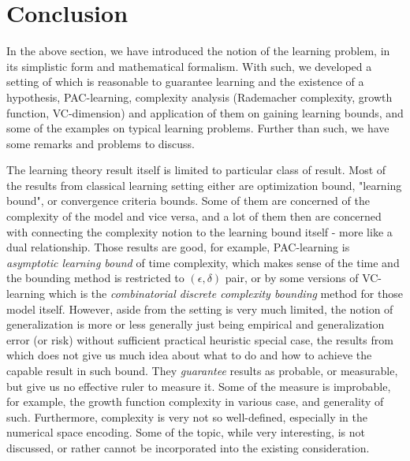 \section{Conclusion}

In the above section, we have introduced the notion of the learning problem, in its simplistic form and mathematical formalism. With such, we developed a setting of which is reasonable to guarantee learning and the existence of a hypothesis, PAC-learning, complexity analysis (Rademacher complexity, growth function, VC-dimension) and application of them on gaining learning bounds, and some of the examples on typical learning problems. Further than such, we have some remarks and problems to discuss. 

The learning theory result itself is limited to particular class of result. Most of the results from classical learning setting either are optimization bound, "learning bound", or convergence criteria bounds. Some of them are concerned of the complexity of the model and vice versa, and a lot of them then are concerned with connecting the complexity notion to the learning bound itself - more like a dual relationship. Those results are good, for example, PAC-learning is \textit{asymptotic learning bound} of time complexity, which makes sense of the time and the bounding method is restricted to $(\epsilon, \delta)$ pair, or by some versions of VC-learning which is the \textit{combinatorial discrete complexity bounding} method for those model itself. However, aside from the setting is very much limited, the notion of generalization is more or less generally just being empirical and generalization error (or risk) without sufficient practical heuristic special case, the results from which does not give us much idea about what to do and how to achieve the capable result in such bound. They \textit{guarantee} results as probable, or measurable, but give us no effective ruler to measure it. Some of the measure is improbable, for example, the growth function complexity in various case, and generality of such. Furthermore, complexity is very not so well-defined, especially in the numerical space encoding. Some of the topic, while very interesting, is not discussed, or rather cannot be incorporated into the existing consideration.

